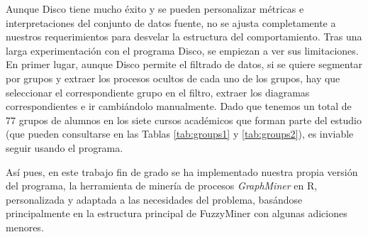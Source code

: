 Aunque Disco tiene mucho éxito y se pueden personalizar métricas e interpretaciones del conjunto de datos fuente, no se ajusta completamente a nuestros requerimientos para desvelar la estructura del comportamiento. Tras una larga experimentación con el programa Disco, se empiezan a ver sus limitaciones. En primer lugar, aunque Disco permite el filtrado de datos, si se quiere segmentar por grupos y extraer los procesos ocultos de cada uno de los grupos, hay que seleccionar el correspondiente grupo en el filtro, extraer los diagramas correspondientes e ir cambiándolo manualmente. Dado que tenemos un total de $77$ grupos de alumnos en los siete cursos académicos que forman parte del estudio (que pueden consultarse en las Tablas \ref{tab:groups1} y \ref{tab:groups2}), es inviable seguir usando el programa.

Así pues, en este trabajo fin de grado se ha implementado nuestra propia versión del programa, la herramienta de minería de procesos \emph{GraphMiner} en R, personalizada y adaptada a las necesidades del problema, basándose principalmente en la estructura principal de FuzzyMiner \cite{gunther2007fuzzy} con algunas adiciones menores.